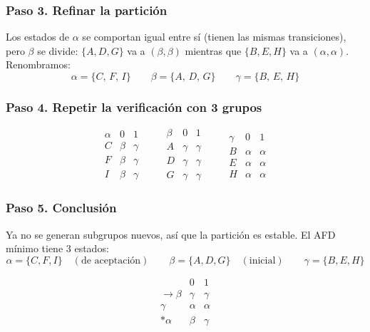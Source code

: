 \documentclass[12pt,letterpaper]{article}
\begin{document}
\begin{enumerate}[label=\arabic*.]
  \subsubsection*{Paso 3. Refinar la partición}
  Los estados de $\alpha$ se comportan igual entre sí (tienen las mismas transiciones), pero $\beta$ se divide: $\{A,D,G\}$ va a $(\beta,\beta)$ mientras que $\{B,E,H\}$ va a $(\alpha,\alpha)$. Renombramos:
  \[
  \alpha = \{C,\, F,\, I\} \qquad \beta = \{A,\, D,\, G\} \qquad \gamma = \{B,\, E,\, H\}
  \]

  \subsubsection*{Paso 4. Repetir la verificación con 3 grupos}
  \[
  \begin{array}{c|cc}
    \alpha & 0 & 1 \\ \hline
    C & \beta & \gamma \\
    F & \beta & \gamma \\
    I & \beta & \gamma
  \end{array}
  \qquad
  \begin{array}{c|cc}
    \beta & 0 & 1 \\ \hline
    A & \gamma & \gamma \\
    D & \gamma & \gamma \\
    G & \gamma & \gamma
  \end{array}
  \qquad
  \begin{array}{c|cc}
    \gamma & 0 & 1 \\ \hline
    B & \alpha & \alpha \\
    E & \alpha & \alpha \\
    H & \alpha & \alpha
  \end{array}
  \]

  \subsubsection*{Paso 5. Conclusión}
  Ya no se generan subgrupos nuevos, así que la partición es estable. El AFD mínimo tiene 3 estados:
  \[
  \alpha = \{C,F,I\} \quad (\text{de aceptación}) \qquad
  \beta = \{A,D,G\} \quad (\text{inicial}) \qquad
  \gamma = \{B,E,H\}
  \]

  \medskip

  \[
  \begin{array}{c|cc}
    & 0 & 1 \\ \hline
    \rightarrow \beta & \gamma & \gamma \\
    \gamma & \alpha & \alpha \\
    * \alpha & \beta & \gamma
  \end{array}
  \]
  

\end{enumerate}
\end{document}
